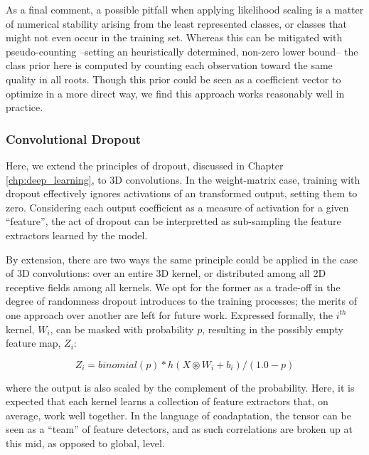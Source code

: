 As a final comment, a possible pitfall when applying likelihood scaling is a matter of numerical stability arising from the least represented classes, or classes that might not even occur in the training set.
Whereas this can be mitigated with pseudo-counting \cite{?} --setting an heuristically determined, non-zero lower bound-- the class prior here is computed by counting each observation toward the same quality in all roots.
Though this prior could be seen as a coefficient vector to optimize in a more direct way, we find this approach works reasonably well in practice.


\subsubsection{Convolutional Dropout}
\label{subsubsec:conv_dropout}

Here, we extend the principles of dropout, discussed in Chapter \ref{chp:deep_learning}, to 3D convolutions.
In the weight-matrix case, training with dropout effectively ignores activations of an transformed output, setting them to zero.
Considering each output coefficient as a measure of activation for a given ``feature'', the act of dropout can be interpretted as sub-sampling the feature extractors learned by the model.

By extension, there are two ways the same principle could be applied in the case of 3D convolutions: over an entire 3D kernel, or distributed among all 2D receptive fields among all kernels.
We opt for the former as a trade-off in the degree of randomness dropout introduces to the training processes; the merits of one approach over another are left for future work.
Expressed formally, the $i^{th}$ kernel, $W_i$, can be masked with probability $p$, resulting in the possibly empty feature map, $Z_i$:

\begin{equation}
Z_i = binomial(p) * h(X \circledast W_i + b_i) / (1.0 - p)
\end{equation}

\noindent where the output is also scaled by the complement of the probability.
Here, it is expected that each kernel learns a collection of feature extractors that, on average, work well together.
In the language of coadaptation, the tensor can be seen as a ``team'' of feature detectors, and as such correlations are broken up at this mid, as opposed to global, level.

